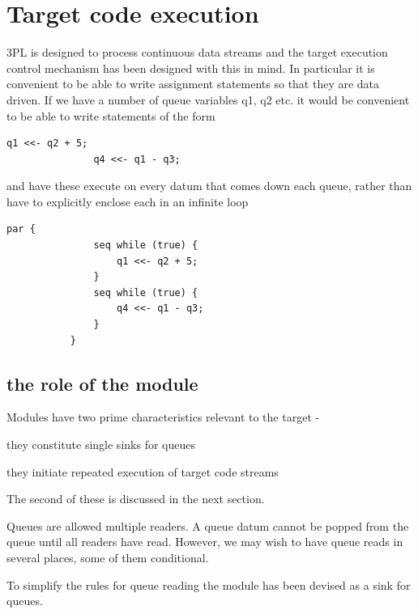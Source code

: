     \section{Target code execution}
    
        3PL is designed to process continuous data streams and the target
        execution control mechanism has been designed with this in mind. In
        particular it is convenient to be able to write assignment statements
        so that they are data driven. If we have a number of queue variables
        q1, q2 etc. it would be convenient to be able to write statements of
        the form
        \begin{lstlisting}[gobble=8, language=threepl]
               q1 <<- q2 + 5;
               q4 <<- q1 - q3;
        \end{lstlisting}
        and have these execute on every datum that comes down each queue,
        rather than have to explicitly enclose each in an infinite loop
        \begin{lstlisting}[gobble=8, language=threepl]
           par {
               seq while (true) {
                   q1 <<- q2 + 5;
               }
               seq while (true) {
                   q4 <<- q1 - q3;
               }
           }
        \end{lstlisting}
        
        \subsection{the role of the module}

            Modules have two prime characteristics relevant to the target -   

            \blist
            \item   they constitute single sinks for queues
            \item   they initiate repeated execution of target code streams
            \blend
            
            The second of these is discussed in the next section.
            
            Queues are allowed multiple readers. A queue datum cannot be popped
            from the queue until all readers have read. However, we may wish
            to have queue reads in several places, some of them conditional.
            
            To simplify the rules for queue reading the module has been
            devised as a sink for queues.
            
